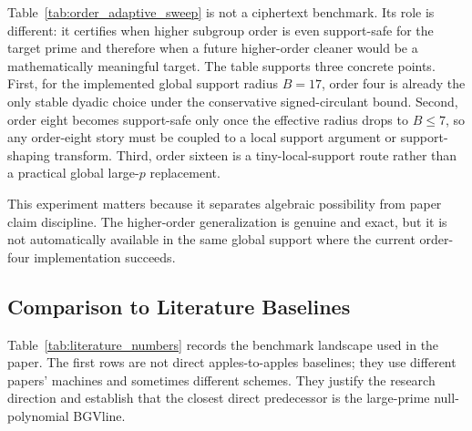 \documentclass[a4paper,runningheads]{llncs}
\newcommand{\BGV}{\textsf{BGV}}
\begin{document}
Table~\ref{tab:order_adaptive_sweep} is not a ciphertext benchmark.  Its role
is different: it certifies when higher subgroup order is even support-safe for
the target prime and therefore when a future higher-order cleaner would be a
mathematically meaningful target.  The table supports three concrete points.
First, for the implemented global support radius $B=17$, order four is already
the only stable dyadic choice under the conservative signed-circulant bound.
Second, order eight becomes support-safe only once the effective radius drops to
$B\le 7$, so any order-eight story must be coupled to a local support argument
or support-shaping transform.  Third, order sixteen is a tiny-local-support
route rather than a practical global large-$p$ replacement.

This experiment matters because it separates algebraic possibility from paper
claim discipline.  The higher-order generalization is genuine and exact, but it
is not automatically available in the same global support where the current
order-four implementation succeeds.

\subsection{Comparison to Literature Baselines}

Table~\ref{tab:literature_numbers} records the benchmark landscape used in the
paper.  The first rows are not direct apples-to-apples baselines; they use
different papers' machines and sometimes different schemes.  They justify the
research direction and establish that the closest direct predecessor is the
large-prime null-polynomial \BGV line.
\end{document}
